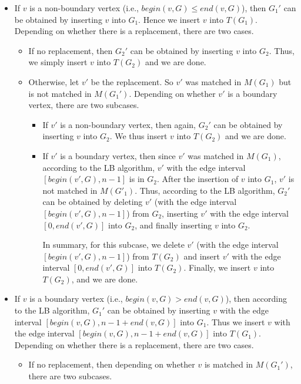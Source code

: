 \documentclass[11pt]{article}
\begin{document}
\begin{itemize}
\item
If $v$ is a non-boundary vertex (i.e., $begin(v,G)\leq end(v,G)$), then
$G_1'$ can be obtained by inserting $v$ into $G_1$. Hence we insert $v$ into
$T(G_1)$. Depending on whether there is a replacement, there are two
cases.

\begin{itemize}
\item
If no replacement, then $G_2'$ can be obtained by inserting $v$
into $G_2$. Thus, we simply insert $v$ into $T(G_2)$ and we
are done.

\item
Otherwise, let $v'$ be the replacement. So $v'$ was matched in
$M(G_1)$ but is not matched in $M(G_1')$.
Depending on whether $v'$ is a boundary vertex, there are two
subcases.

\begin{itemize}
\item
If $v'$ is a non-boundary vertex, then again, $G_2'$ can be obtained
by inserting $v$ into $G_2$. We thus insert $v$ into $T(G_2)$ and we
are done.


\item
If $v'$ is a boundary vertex, then
since $v'$ was matched in $M(G_1)$, according to the LB algorithm,
$v'$ with the edge interval $[begin(v',G),n-1]$ is in $G_2$.
After the insertion of $v$ into $G_1$, $v'$ is not matched in $M(G'_1)$.
Thus, according to the LB algorithm, $G_2'$ can be obtained by
deleting $v'$ (with the edge interval $[begin(v',G),n-1]$) from $G_2$, inserting
$v'$ with the edge interval $[0,end(v',G)]$ into $G_2$, and finally inserting $v$ into $G_2$.

In summary, for this subcase, we delete $v'$ (with the edge interval
$[begin(v',G),n-1]$) from $T(G_2)$ and insert
$v'$ with the edge interval $[0,end(v',G)]$ into $T(G_2)$.
Finally, we insert $v$ into $T(G_2)$, and we are done.
\end{itemize}
\end{itemize}

\item
If $v$ is a boundary vertex (i.e., $begin(v,G)> end(v,G)$),
then according to the LB algorithm, $G_1'$ can be obtained by
inserting $v$ with the edge interval $[begin(v,G),n-1+end(v,G)]$ into $G_1$.
Thus we insert $v$ with the edge interval $[begin(v,G),n-1+end(v,G)]$ into $T(G_1)$.
Depending on whether there is a replacement, there are two
cases.

\begin{itemize}
\item
If no replacement, then depending on whether $v$ is matched in $M(G_1')$,
there are two subcases.


\end{itemize}
\end{itemize}
\end{document}
